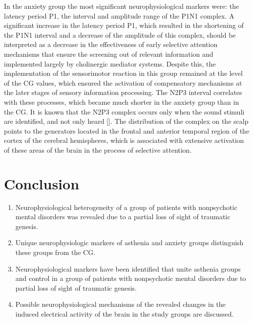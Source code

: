 \documentclass[twocolumn]{article}
\begin{document}
\par In the anxiety group the most significant neurophysiological markers were: the latency period P1, the interval and amplitude range of the P1N1 complex. A significant increase in the latency period P1, which resulted in the shortening of the P1N1 interval and a decrease of the amplitude of this complex, should be interpreted as a decrease in the effectiveness of early selective attention mechanisms that ensure the screening out of relevant information and implemented largely by cholinergic mediator systems. Despite this, the implementation of the sensorimotor reaction in this group remained at the level of the CG values, which ensured the activation of compensatory mechanisms at the later stages of sensory information processing. The N2P3 interval correlates with these processes, which became much shorter in the anxiety group than in the CG. It is known that the N2P3 complex occurs only when the sound stimuli are identified, and not only heard [\cite{bib35}]. The distribution of the complex on the scalp points to the generators located in the frontal and anterior temporal region of the cortex of the cerebral hemispheres, which is associated with extensive activation of these areas of the brain in the process of selective attention.
\section {Conclusion}
\begin{enumerate}
\item Neurophysiological heterogeneity of a group of patients with nonpsychotic mental disorders was revealed due to a partial loss of sight of traumatic genesis.
\item Unique neurophysiologic markers of asthenia and anxiety groups distinguish these groups from the CG.
\item Neurophysiological markers have been identified that unite asthenia groups and control in a group of patients with nonpsychotic mental disorders due to partial loss of sight of traumatic genesis.
\item Possible neurophysiological mechanisms of the revealed changes in the induced electrical activity of the brain in the study groups are discussed.
\end{enumerate}
\end{document}
